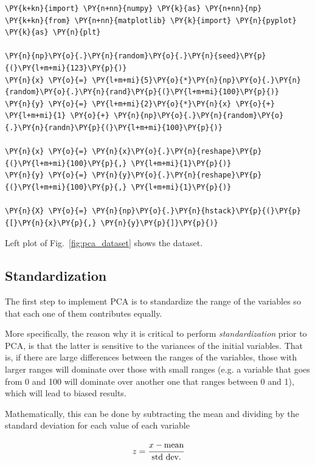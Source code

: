\begin{tcolorbox}[breakable, size=fbox, boxrule=1pt, pad at break*=1mm,colback=cellbackground, colframe=cellborder]
\begin{Verbatim}[commandchars=\\\{\}]
\PY{k+kn}{import} \PY{n+nn}{numpy} \PY{k}{as} \PY{n+nn}{np}
\PY{k+kn}{from} \PY{n+nn}{matplotlib} \PY{k}{import} \PY{n}{pyplot} \PY{k}{as} \PY{n}{plt}
	
\PY{n}{np}\PY{o}{.}\PY{n}{random}\PY{o}{.}\PY{n}{seed}\PY{p}{(}\PY{l+m+mi}{123}\PY{p}{)}
\PY{n}{x} \PY{o}{=} \PY{l+m+mi}{5}\PY{o}{*}\PY{n}{np}\PY{o}{.}\PY{n}{random}\PY{o}{.}\PY{n}{rand}\PY{p}{(}\PY{l+m+mi}{100}\PY{p}{)}
\PY{n}{y} \PY{o}{=} \PY{l+m+mi}{2}\PY{o}{*}\PY{n}{x} \PY{o}{+} \PY{l+m+mi}{1} \PY{o}{+} \PY{n}{np}\PY{o}{.}\PY{n}{random}\PY{o}{.}\PY{n}{randn}\PY{p}{(}\PY{l+m+mi}{100}\PY{p}{)}
	
\PY{n}{x} \PY{o}{=} \PY{n}{x}\PY{o}{.}\PY{n}{reshape}\PY{p}{(}\PY{l+m+mi}{100}\PY{p}{,} \PY{l+m+mi}{1}\PY{p}{)}
\PY{n}{y} \PY{o}{=} \PY{n}{y}\PY{o}{.}\PY{n}{reshape}\PY{p}{(}\PY{l+m+mi}{100}\PY{p}{,} \PY{l+m+mi}{1}\PY{p}{)}
	
\PY{n}{X} \PY{o}{=} \PY{n}{np}\PY{o}{.}\PY{n}{hstack}\PY{p}{(}\PY{p}{[}\PY{n}{x}\PY{p}{,} \PY{n}{y}\PY{p}{]}\PY{p}{)}
\end{Verbatim}
\end{tcolorbox}

Left plot of Fig.~\ref{fig:pca_dataset} shows the dataset.

\subsection{Standardization}
The first step to implement PCA is to standardize the range of the variables so that each one of them contributes equally.

More specifically, the reason why it is critical to perform \emph{standardization} prior to PCA, is that the latter is sensitive to the variances of the initial variables. That is, if there are large differences between the ranges of the variables, those with larger ranges will dominate over those with small ranges (e.g. a variable that goes from 0 and 100 will dominate over another one that ranges between 0 and 1), which will lead to biased results. 

Mathematically, this can be done by subtracting the mean and dividing by the standard deviation for each value of each variable

\begin{equation}
z = \cfrac{x - \textrm{mean}}{\textrm{std dev.}}
\end{equation}

